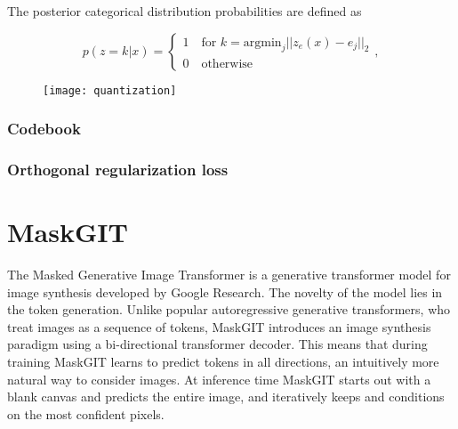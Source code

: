 \documentclass[../../thesis.tex]{subfiles}
\begin{document}
The posterior categorical distribution probabilities are defined as

\begin{equation}
    p(z=k | x) = 
    \begin{cases} 
        1 \quad \text{for }k = \textrm{argmin}_j||z_e(x) - e_j||_2 \\
        0 \quad \text{otherwise}
    \end{cases},
\end{equation}




\begin{figure}[h]
    \texttt{[image: quantization]}
    \centering    
\end{figure}

\subsubsection{Codebook}

\subsubsection{Orthogonal regularization loss}

\cite{shin2023exploration} 




\section{MaskGIT}

The Masked Generative Image Transformer is a generative transformer model for image synthesis developed by Google Research. The novelty of the model lies in the token generation. Unlike popular autoregressive generative transformers, who treat images as a sequence of tokens, MaskGIT introduces an image synthesis paradigm using a bi-directional transformer decoder. This means that during training MaskGIT learns to predict tokens in all directions, an intuitively more natural way to consider images. At inference time MaskGIT starts out with a blank canvas and predicts the entire image, and iteratively keeps and conditions on the most confident pixels.\\\\

\end{document}
